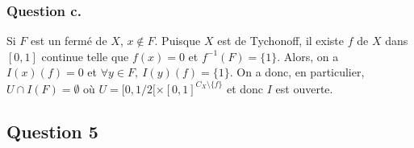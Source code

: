 \documentclass{cours}
\begin{document}
\subsubsection{Question c.}
Si $F$ est un fermé de $X$, $x \notin F$. Puisque $X$ est de Tychonoff, il existe $f$ de $X$ dans $[0, 1]$ continue telle que $f(x) = 0$ et $f^{-1}(F) = \{1\}$. Alors, on a $I(x)(f) = 0$ et $\forall y \in F, \ I(y)(f) = \{1\}$. On a donc, en particulier, $U \cap I(F) = \emptyset$ où $U = [0, 1/2[ \times [0, 1]^{C_{X} \setminus \{f\}}$ et donc $I$ est ouverte.

\subsection{Question 5}
\end{document}
